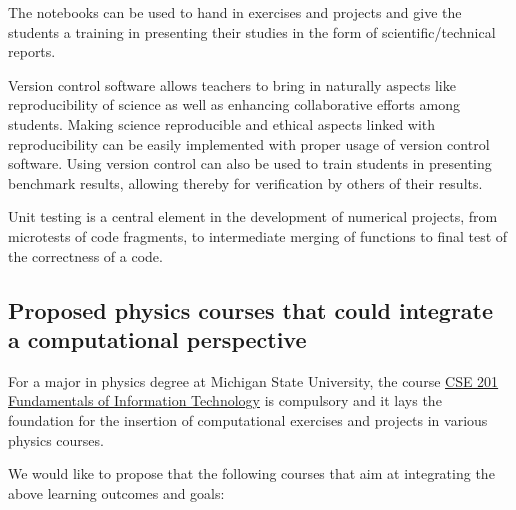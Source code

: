 \documentclass[%
oneside,                 %
final,                   %
10pt]{article}
\begin{document}
\noindent
The notebooks can be used to hand in exercises and projects and give the students a training in presenting their studies in the form of scientific/technical reports.

Version control software allows teachers to bring in naturally aspects like reproducibility of science as well as enhancing
collaborative efforts among students. Making science reproducible and ethical aspects linked with reproducibility can be easily implemented with proper usage of version control software. Using version control can also be used to train students in presenting benchmark results, allowing thereby for verification by others of their results. 

Unit testing is a central element in the development of numerical projects, from microtests of code fragments, to intermediate merging of functions to final test of the correctness of a code.

\subsection{Proposed physics courses that could integrate a computational perspective}

For a major in physics degree at Michigan State University, the course \href{{https://www.cse.msu.edu/~cse201/}}{CSE 201 Fundamentals of Information Technology} is compulsory and it lays the foundation for the insertion of computational exercises and projects in various physics courses. 

We would like to propose that the following courses that aim at integrating the above learning outcomes and goals:
\end{document}
